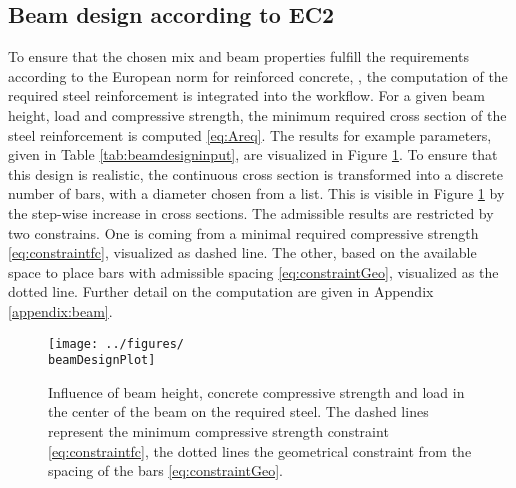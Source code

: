 \subsection{Beam design according to EC2}
To ensure that the chosen mix and beam properties fulfill the requirements according to the European norm for reinforced concrete, \cite{DIN1992-1-1}, the computation of the required steel reinforcement is integrated into the workflow.
For a given beam height, load and compressive strength, the minimum required cross section of the steel reinforcement is computed \eqref{eq:Areq}.
The results for example parameters, given in Table \ref{tab:beamdesigninput}, are visualized in Figure \ref{fig:beamdesign}.
To ensure that this design is realistic, the continuous cross section is transformed into a discrete number of bars, with a diameter chosen from a list.
This is visible in Figure \ref{fig:beamdesign} by the step-wise increase in cross sections.
The admissible results are restricted by two constrains.
One is coming from a minimal required compressive strength \eqref{eq:constraintfc}, visualized as dashed line.
The other, based on the available space to place bars with admissible spacing \eqref{eq:constraintGeo}, visualized as the dotted line.
Further detail on the computation are given in Appendix \ref{appendix:beam}.

\begin{figure}[ht]%
	\centering
	\texttt{[image: ../figures/\\beamDesignPlot]}
	\caption{Influence of beam height, concrete compressive strength and load in the center of the beam on the required steel. The dashed lines represent the minimum compressive strength constraint \eqref{eq:constraintfc}, the dotted lines the geometrical constraint from the spacing of the bars \eqref{eq:constraintGeo}.\label{fig:beamdesign}}
\end{figure}